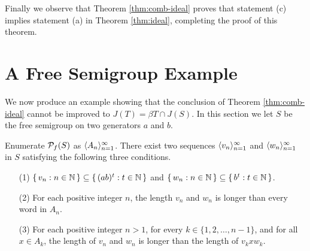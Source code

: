 Finally we observe that Theorem \ref{thm:comb-ideal} proves that statement (c) implies statement (a) in Theorem \ref{thm:ideal}, completing the proof of this theorem. 
\section{A Free Semigroup Example}
\label{sec:example}

We now produce an example showing that the conclusion of Theorem \ref{thm:comb-ideal} cannot be improved to $J(T) = \beta T \cap J(S)$.
In this section we let $S$ be the free semigroup on two generators $a$ and $b$.

\begin{lem}
  \label{lem:seqs}
  Enumerate $\mathcal{P}_f(S)$ as $\langle A_n \rangle_{n=1}^\infty$.
  There exist two sequences $\langle v_n \rangle_{n=1}^\infty$ and $\langle w_n \rangle_{n=1}^\infty$ in $S$ satisfying the following three conditions.
  \begin{itemize}
    \item[(1)]
      $\{\, v_n : n \in \mathbb{N} \,\} \subseteq \{\, (ab)^t : t \in \mathbb{N} \,\}$ and $\{\, w_n : n \in \mathbb{N} \,\} \subseteq \{\, b^t : t \in \mathbb{N} \,\}$.

    \item[(2)]
      For each positive integer $n$, the length $v_n$ and $w_n$ is longer than every word in $A_n$.

    \item[(3)]
      For each positive integer $n > 1$, for every $k \in \{1, 2, \ldots, n-1\}$, and for all $x \in A_k$, the length of $v_n$ and $w_n$ is longer than the length of $v_kxw_k$.
  \end{itemize}
\end{lem}
